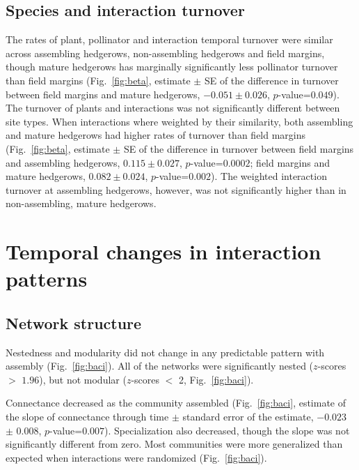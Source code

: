 \documentclass[12pt]{article}
\begin{document}
\subsection*{Species and interaction turnover}
The rates of plant, pollinator and interaction temporal turnover were
similar across assembling hedgerows, non-assembling hedgerows and
field margins, though mature hedgerows has marginally significantly
less pollinator turnover than field margins (Fig.~\ref{fig:beta},
estimate $\pm$ SE of the difference in turnover between field margins
and mature hedgerows, $-0.051 \pm 0.026$, $p$-value=$0.049$). The turnover of plants and interactions was not significantly different between site types. When
interactions where weighted by their similarity, both assembling and
mature hedgerows had higher rates of turnover than field margins
(Fig.~\ref{fig:beta}, estimate $\pm$ SE of the difference in turnover
between field margins and assembling hedgerows, $0.115 \pm 0.027$,
$p$-value=$0.0002$; field margins and mature hedgerows, $0.082 \pm
0.024$, $p$-value=$0.002$). The weighted interaction turnover at
assembling hedgerows, however, was not significantly higher than in
non-assembling, mature hedgerows. 

\section*{Temporal changes in interaction patterns}
\subsection*{Network structure}
Nestedness and modularity did not change in any predictable pattern
with assembly (Fig.~\ref{fig:baci}). All of the networks were
significantly nested ($z$-scores $>$ $1.96$), but not modular ($z$-scores
$<$ 2, Fig.~\ref{fig:baci}).


Connectance decreased as the community assembled (Fig.~\ref{fig:baci},
estimate of the slope of connectance through time $\pm$ standard error
of the estimate, $-0.023$ $\pm$ $0.008$,
$p$-value=$0.007$). Specialization also decreased, though the slope
was not significantly different from
zero. %
Most communities were more generalized than expected when interactions
were randomized (Fig.~\ref{fig:baci}).
\end{document}
